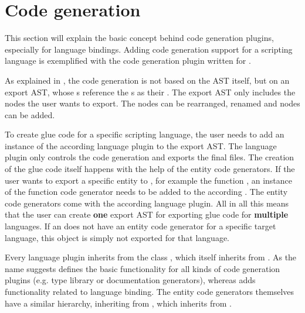 \section{Code generation}

This section will explain the basic concept behind code generation plugins, especially for language bindings. Adding code generation support for a scripting language is exemplified with the code generation plugin written for .

As explained in , the code generation is not based on the  AST itself, but on an export AST, whose s reference the s as their . The export AST only includes the nodes the user wants to export. The nodes can be rearranged, renamed and  nodes can be added. 

To create glue code for a specific scripting language, the user needs to add an instance of the according language plugin to the export AST. The language plugin only controls the code generation and exports the final files. The creation of the glue code itself happens with the help of the entity code generators. If the user wants to export a specific  entity to , for example the function , an instance of the  function code generator needs to be added to the according . The entity code generators come with the according language plugin. All in all this means that the user can create \textbf{one} export AST for exporting glue code for \textbf{multiple} languages. If an  does not have an entity code generator for a specific target language, this object is simply not exported for that language.

Every language plugin inherits from the class , which itself inherits from . As the name suggests  defines the basic functionality for all kinds of code generation plugins (e.g. type library or documentation generators), whereas  adds functionality related to language binding. The entity code generators themselves have a similar hierarchy, inheriting from , which inherits from .

